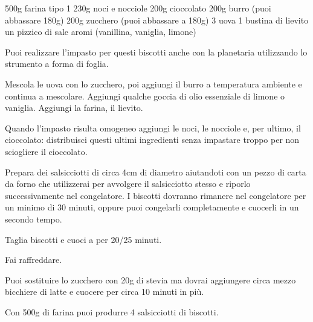 \begin{ingreds}
	500g farina tipo 1
	230g noci e nocciole
	200g cioccolato
	200g burro (puoi abbassare 180g)
	200g zucchero (puoi abbassare a 180g)
	3 uova
	1 bustina di lievito
	un pizzico di sale
	aromi (vanillina, vaniglia, limone)

\end{ingreds}

\begin{method}
Puoi realizzare l'impasto per questi biscotti anche con la planetaria utilizzando lo strumento a forma di foglia.

Mescola le uova con lo zucchero, poi aggiungi il burro a temperatura ambiente e continua a mescolare. Aggiungi qualche goccia di olio essenziale di limone o vaniglia. Aggiungi la farina, il lievito.

Quando l'impasto risulta omogeneo aggiungi le noci, le nocciole e, per ultimo, il cioccolato: distribuisci questi ultimi ingredienti senza impastare troppo per non sciogliere il cioccolato.
	
Prepara dei salsicciotti di circa 4cm di diametro aiutandoti con un pezzo di carta da forno che utilizzerai per avvolgere il salsicciotto stesso e riporlo successivamente nel congelatore. I biscotti dovranno rimanere nel congelatore per un minimo di 30 minuti, oppure puoi congelarli completamente e cuocerli in un secondo tempo.
	
Taglia biscotti e cuoci a  per 20/25 minuti.

Fai raffreddare.

\end{method}

\begin{note}
		Puoi sostituire lo zucchero con 20g di stevia ma dovrai aggiungere circa mezzo bicchiere di latte e cuocere per circa 10 minuti in più.
		
		Con 500g di farina puoi produrre 4 salsicciotti di biscotti.

	\end{note}

